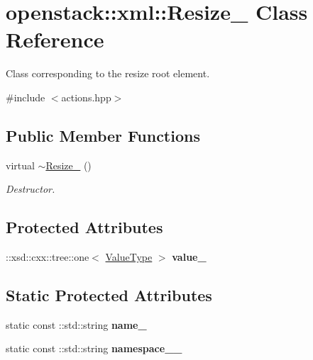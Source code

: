 \hypertarget{classopenstack_1_1xml_1_1Resize__}{
\section{openstack::xml::Resize\_\- Class Reference}
\label{classopenstack_1_1xml_1_1Resize__}
}


Class corresponding to the resize root element.  




{\ttfamily \#include $<$actions.hpp$>$}

\subsection*{Public Member Functions}
\begin{DoxyCompactItemize}
\item 
\hypertarget{classopenstack_1_1xml_1_1Resize___a29fe76dd1b0d7c2afc8ee2abfa467a8f}{
virtual \hyperlink{classopenstack_1_1xml_1_1Resize___a29fe76dd1b0d7c2afc8ee2abfa467a8f}{$\sim$Resize\_\-} ()}
\label{classopenstack_1_1xml_1_1Resize___a29fe76dd1b0d7c2afc8ee2abfa467a8f}

\begin{DoxyCompactList}\small\item\em Destructor. \item\end{DoxyCompactList}\end{DoxyCompactItemize}
\subsection*{Protected Attributes}
\begin{DoxyCompactItemize}
\item 
\hypertarget{classopenstack_1_1xml_1_1Resize___a4d126eb6c2d19a1becfe86e7ce92e9f7}{
::xsd::cxx::tree::one$<$ \hyperlink{classopenstack_1_1xml_1_1Resize}{ValueType} $>$ {\bfseries value\_\-}}
\label{classopenstack_1_1xml_1_1Resize___a4d126eb6c2d19a1becfe86e7ce92e9f7}

\end{DoxyCompactItemize}
\subsection*{Static Protected Attributes}
\begin{DoxyCompactItemize}
\item 
\hypertarget{classopenstack_1_1xml_1_1Resize___a19eff6b4eec518809daa03c5c37a1d51}{
static const ::std::string {\bfseries name\_\-}}
\label{classopenstack_1_1xml_1_1Resize___a19eff6b4eec518809daa03c5c37a1d51}

\item 
\hypertarget{classopenstack_1_1xml_1_1Resize___a75b69ef7f95856f5c8f1968634140fd4}{
static const ::std::string {\bfseries namespace\_\-\_\-}}
\label{classopenstack_1_1xml_1_1Resize___a75b69ef7f95856f5c8f1968634140fd4}

\end{DoxyCompactItemize}
